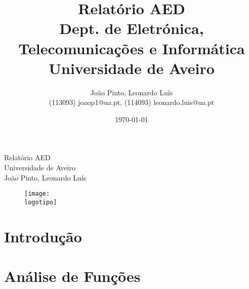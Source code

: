 \documentclass{report}
\begin{document}
%
\def\titulo{Relatório AED}
\def\data{25/11/2023}
\def\autores{João Pinto, Leonardo Luís}
\def\autorescontactos{(113093) joaop1@ua.pt, (114093) leonardo.luis@ua.pt}
\def\departamento{Dept. de Eletrónica, Telecomunicações e Informática}
\def\empresa{Universidade de Aveiro}
\def\logotipo{ua.pdf}
%
%
\begin{titlepage}

\begin{center}
%
\vspace*{50mm}
%
{\Huge \titulo}\\ 
%
\vspace{10mm}
%
{\Large \empresa}\\
%
\vspace{10mm}
%
{\LARGE \autores}\\ 
%
\vspace{30mm}
%
\begin{figure}[h]
\center
\texttt{[image: \\logotipo]}
\end{figure}
%
\vspace{30mm}
\end{center}
%
\begin{flushright}
\end{flushright}
\end{titlepage}

\title{%
{\Huge\textbf{\titulo}}\\
{\Large \departamento\\ \empresa}
}
%
\author{%
    \autores \\
    \autorescontactos
}
%
\date{\today}
%
\maketitle


\tableofcontents


\clearpage
{}

\chapter{Introdução}
\label{chap.introducao}


\chapter{Análise de Funções}
\label{chap.analise}
\end{document}
